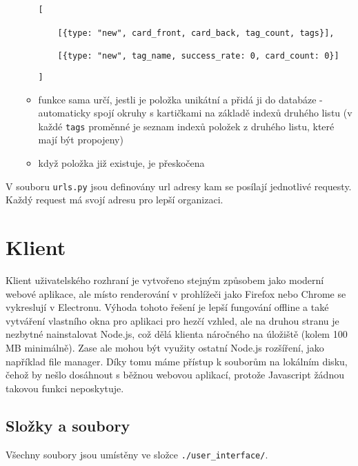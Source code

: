 \documentclass[11pt]{article}
\let\oldtexttt\texttt
\renewcommand{\texttt}[1]{\oldtexttt{\textcolor{codehighlight}{#1}}}
\begin{document}
\begin{itemize}
\begin{itemize}
    \texttt{{[}}

    ~~~~\texttt{{[}\{type:\ "new",\ card\_front,\ card\_back,\ tag\_count,\ tags\}{]},}

    ~~~~\texttt{{[}\{type:\ "new",\ tag\_name,\ success\_rate:\ 0,\ card\_count:\ 0\}{]}}

    \texttt{{]}}
  \item
    funkce sama určí, jestli je položka unikátní a přidá ji do databáze
    - automaticky spojí okruhy s kartičkami na základě indexů druhého
    listu (v každé \texttt{tags} proměnné je seznam indexů položek z
    druhého listu, které mají být propojeny)
  \item
    když položka již existuje, je přeskočena
  \end{itemize}
\end{itemize}

V souboru \texttt{urls.py} jsou definovány url adresy kam se posílají
jednotlivé requesty. Každý request má svojí adresu pro lepší organizaci.

\hypertarget{klient}{%
\section{Klient}\label{klient}}

Klient uživatelského rozhraní je vytvořeno stejným způsobem jako moderní
webové aplikace, ale místo renderování v prohlížeči jako Firefox nebo
Chrome se vykreslují v Electronu. Výhoda tohoto řešení je lepší
fungování offline a také vytváření vlastního okna pro aplikaci pro hezčí
vzhled, ale na druhou stranu je nezbytné nainstalovat Node.js, což dělá
klienta náročného na úložiště (kolem 100 MB minimálně). Zase ale mohou
být využity ostatní Node.js rozšíření, jako například file manager. Díky
tomu máme přístup k souborům na lokálním disku, čehož by nešlo dosáhnout
s běžnou webovou aplikací, protože Javascript žádnou takovou funkci
neposkytuje.

\hypertarget{sloux17eky-a-soubory}{%
\subsection{Složky a soubory}\label{sloux17eky-a-soubory}}

Všechny soubory jsou umístěny ve složce \texttt{./user\_interface/}.
\end{document}
